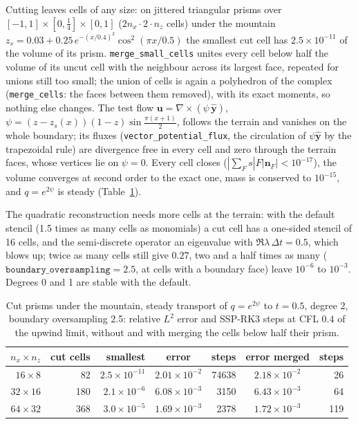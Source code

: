 \documentclass[preprint,12pt]{elsarticle}
\newcommand{\bn}{\mathbf{n}}
\newcommand{\bu}{\mathbf{u}}
\newcommand{\code}[1]{\texttt{#1}}
\theoremstyle{definition}
\begin{document}
Cutting leaves cells of any size: on jittered triangular prisms over $[-1,1]\times[0,\frac14]\times[0,1]$
($2n_x\cdot2\cdot n_z$ cells) under the mountain
$z_s=0.03+0.25\,e^{-(x/0.4)^2}\cos^2(\pi x/0.5)$ the smallest cut cell has $2.5\times10^{-11}$ of the volume
of its prism. \code{merge\_small\_cells} unites every cell below half the volume of its uncut
cell with the neighbour across its largest face, repeated for unions still too small; the union of
cells is again a polyhedron of the complex (\code{merge\_cells}: the faces between them removed), with
its exact moments, so nothing else changes. The test flow
$\bu=\nabla\times(\psi\,\hat{\mathbf y})$, $\psi=(z-z_s(x))(1-z)\sin\frac{\pi(x+1)}2$, follows the
terrain and vanishes on the whole boundary; its fluxes (\code{vector\_potential\_flux}, the circulation
of $\psi\hat{\mathbf y}$ by the trapezoidal rule) are divergence free in every cell and zero through the
terrain faces, whose vertices lie on $\psi=0$. Every cell closes ($|\sum_F s|F|\bn_F|<10^{-17}$), the
volume converges at second order to the exact one, mass is conserved to $10^{-15}$, and $q=e^{2\psi}$ is
steady (Table~\ref{tab:cut}).

The quadratic reconstruction needs more cells at the terrain: with the default stencil
(1.5 times as many cells as monomials) a cut cell has a one-sided stencil of 16 cells, and the
semi-discrete operator an eigenvalue with $\Re\lambda\,\Delta t=0.5$, which blows up; twice as many
cells still give $0.27$, two and a half times as many ($\code{boundary\_oversampling}=2.5$, at cells
with a boundary face) leave $10^{-6}$ to $10^{-3}$. Degrees 0 and 1 are stable with the default.

\begin{table}[h]
\centering
\caption{Cut prisms under the mountain, steady transport of $q=e^{2\psi}$ to $t=0.5$, degree 2, boundary
oversampling 2.5: relative $L^2$ error and SSP-RK3 steps at CFL $0.4$ of the upwind limit, without and
with merging the cells below half their prism.}
\label{tab:cut}
\begin{tabular}{rrrcrcr}
\toprule
$n_x\times n_z$ & cut cells & smallest & error & steps & error merged & steps \\
\midrule
$16\times8$ & 82 & $2.5\times10^{-11}$ & $2.01\times10^{-2}$ & 74638 & $2.18\times10^{-2}$ & 26 \\
$32\times16$ & 180 & $2.1\times10^{-6}$ & $6.08\times10^{-3}$ & 3150 & $6.43\times10^{-3}$ & 64 \\
$64\times32$ & 368 & $3.0\times10^{-5}$ & $1.69\times10^{-3}$ & 2378 & $1.72\times10^{-3}$ & 119 \\
\bottomrule
\end{tabular}
\end{table}
\end{document}
